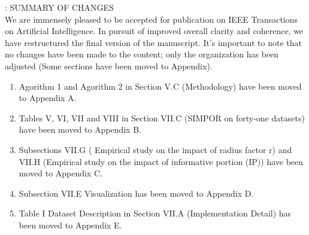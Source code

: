 
\fontsize{12}{21}\selectfont
\onecolumn

 \Methodname{}: SUMMARY OF CHANGES
\\

We are immensely pleased to be accepted for publication on IEEE Transactions on Artificial Intelligence. In pursuit of improved overall clarity and coherence, we have restructured the final version of the manuscript. It's important to note that no changes have been made to the content; only the organization has been adjusted (Some sections have been moved to Appendix).  

\begin{enumerate}
	
	\item Agorithm 1 and Agorithm 2 in Section V.C (Methodology) have been moved to Appendix A.
	\item Tables V, VI, VII and VIII in Section VII.C (SIMPOR on forty-one datasets) have been moved to Appendix B.
	\item Subsections VII.G ( Empirical study on the impact of radius factor r) and VII.H (Empirical study on the impact of informative portion (IP))  have been moved to Appendix C.
	\item Subsection VII.E Visualization has been moved to Appendix D.
	\item Table I Dataset Description in Section VII.A (Implementation Detail) has been moved to Appendix E.
	
	  
\end{enumerate}



